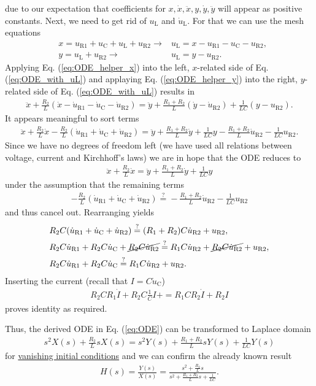 \documentclass[a4paper,11pt,oneside]{scrartcl}
\newcommand{\eq}[1]{Eq. (\ref{#1})}
\newcommand\uc{u_\mathrm{C}}
\newcommand\duc{\dot{u}_\mathrm{C}}
\newcommand\ul{u_\mathrm{L}}
\newcommand\dul{\dot{u}_\mathrm{L}}
\newcommand\uri{u_\mathrm{R1}}
\newcommand\duri{\dot{u}_\mathrm{R1}}
\newcommand\urii{u_\mathrm{R2}}
\newcommand\durii{\dot{u}_\mathrm{R2}}
\newcommand\dx{\dot{x}}
\newcommand\ddx{\ddot{x}}
\newcommand\dy{\dot{y}}
\newcommand\ddy{\ddot{y}}
\renewcommand\c{I}
\newcommand\dc{\dot{I}}
\begin{document}
%
due to our expectation that coefficients for $x, \dx, \ddx, y, \dy, \ddy$
will appear as positive constants.
%
Next, we need to get rid of $\ul$ and $\dul$. For that we can use the mesh
equations
%
\begin{align}
\label{eq:ODE_helper_x}
&x = \uri + \uc + \ul + \urii \rightarrow& \ul = x - \uri - \uc - \urii,\\
\label{eq:ODE_helper_y}
&y = \ul + \urii \rightarrow& \ul = y - \urii.
\end{align}
%
Applying \eq{eq:ODE_helper_x} into the left, $x$-related  side of \eq{eq:ODE_with_uL}
and applaying \eq{eq:ODE_helper_y} into the right, $y$-related side of \eq{eq:ODE_with_uL}
results in
%
\begin{align}
\label{eq:ODE_tmp1}
\ddx + \frac{R_2}{L} (\dx - \duri - \duc - \durii) = \ddy + \frac{R_1+R_2}{L} (\dy - \durii) + \frac{1}{L C} (y - \urii).
\end{align}
%
It appears meaningful to sort terms
\begin{align}
\ddx + \frac{R_2}{L} \dx - \frac{R_2}{L} (\duri + \duc + \durii)
=
\ddy + \frac{R_1+R_2}{L} \dy + \frac{1}{L C} y
- \frac{R_1+R_2}{L} \durii - \frac{1}{L C} \urii.
\end{align}
Since we have no degrees of freedom left
(we have used all relations between voltage, current and Kirchhoff's laws)
we are in hope that the ODE reduces to
\begin{align}
\label{eq:ODE}
\boxed{
\ddx + \frac{R_2}{L} \dx
=
\ddy + \frac{R_1+R_2}{L} \dy + \frac{1}{L C} y}
\end{align}
under the assumption that the remaining terms
\begin{align}
- \frac{R_2}{L} (\duri + \duc + \durii)
\stackrel{?}{=}
- \frac{R_1+R_2}{L} \durii - \frac{1}{L C} \urii
\end{align}
and thus cancel out.
%
Rearranging yields
\begin{align}
&R_2 C (\duri + \duc + \durii)
\stackrel{?}{=}
(R_1+R_2) C \durii + \urii,\\
&R_2 C \duri+
R_2 C \duc+
\cancel{R_2 C \durii}
\stackrel{?}{=}
R_1 C \durii + \cancel{R_2 C \durii} + \urii,\\
&R_2 C \duri+
R_2 C \duc
\stackrel{?}{=}
R_1 C \durii+
\urii.
\end{align}
%
Inserting the current (recall that $\c = C \duc$)
\begin{align}
R_2 C R_1 \dc+
R_2 C \frac{1}{C} \c+
=
R_1 C R_2 \dc+
R_2 \c
\end{align}
proves identity as required.

Thus, the derived ODE in \eq{eq:ODE} can be transformed to Laplace domain
\begin{align}
s^2 X(s) + \frac{R_2}{L} s X(s)
=
s^2 Y(s) + \frac{R_1+R_2}{L} s Y(s) + \frac{1}{L C} Y(s)
\end{align}
%
for \underline{vanishing initial conditions} and we can confirm the already known result
%
\begin{align}
\boxed{
H(s) = \frac{Y(s)}{X(s)} =
\frac{s^2 + \frac{R_2}{L} s}
{s^2 + \frac{R_1+R_2}{L} s + \frac{1}{L C}}
}.
\end{align}
%


\end{document}
